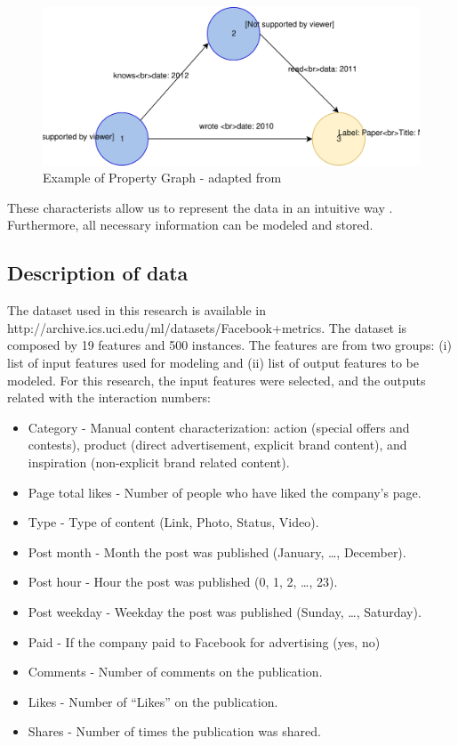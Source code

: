 \begin{figure}
\centering
\includegraphics{../figures/property-graph.svg}
\caption{Example of Property Graph - adapted from \cite{neo4j}}
\end{figure}

These characterists allow us to represent the data in an intuitive way
\cite{graphDB}. Furthermore, all necessary information can be modeled
and stored.

\subsection{Description of data}\label{description-of-data}

The dataset used in this research \cite{social} is available in
http://archive.ics.uci.edu/ml/datasets/Facebook+metrics. The dataset is
composed by 19 features and 500 instances. The features are from two
groups: (i) list of input features used for modeling and (ii) list of
output features to be modeled. For this research, the input features
were selected, and the outputs related with the interaction numbers:

\begin{itemize}
\tightlist
\item
  Category - Manual content characterization: action (special offers and
  contests), product (direct advertisement, explicit brand content), and
  inspiration (non-explicit brand related content).
\item
  Page total likes - Number of people who have liked the company's page.
\item
  Type - Type of content (Link, Photo, Status, Video).
\item
  Post month - Month the post was published (January, \ldots{},
  December).
\item
  Post hour - Hour the post was published (0, 1, 2, \ldots{}, 23).
\item
  Post weekday - Weekday the post was published (Sunday, \ldots{},
  Saturday).
\item
  Paid - If the company paid to Facebook for advertising (yes, no)
\item
  Comments - Number of comments on the publication.
\item
  Likes - Number of ``Likes'' on the publication.
\item
  Shares - Number of times the publication was shared.
\end{itemize}

